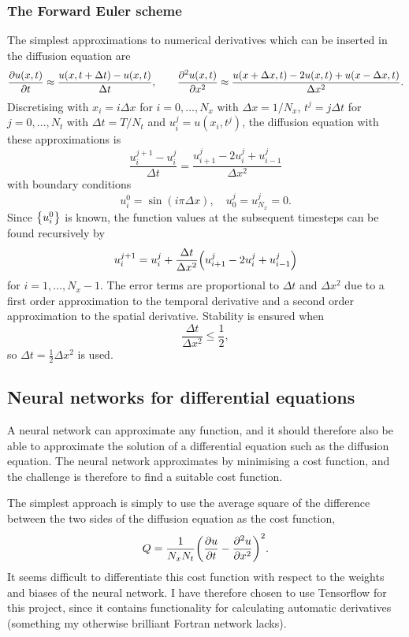 \documentclass[11pt,british,a4paper]{article}
\numberwithin{equation}{section}
\begin{document}
\subsubsection{The Forward Euler scheme}
The simplest approximations to numerical derivatives which can be inserted in the diffusion equation are
\begin{equation}
    \pdv{u(x,t)}{t} \approx \frac{u(x,t+\Delta t) - u(x,t)}{\Delta t}, \qquad
    \pdv[2]{u(x,t)}{x} \approx \frac{u(x+\Delta x, t) - 2u(x,t) + u(x-\Delta x,t)}{\Delta x^2}.
\end{equation}
Discretising with \(x_i=i\Delta x\) for \(i=0,\ldots,N_x\) with \(\Delta x=1/N_x\), \(t^j=j\Delta t\) for \(j=0,\ldots,N_t\) with \(\Delta t=T/N_t\) and \(u_i^j = u(x_i,t^j)\), the diffusion equation with these approximations is
\begin{equation}
    \frac{u_i^{j+1} - u_i^j}{\Delta t} = \frac{u_{i+1}^j - 2u_i^j + u_{i-1}^j}{\Delta x^2}
\end{equation}
with boundary conditions
\begin{equation}
    u_i^0 = \sin(i\pi\Delta x),\quad
    u_0^j = u_{N_x}^j = 0.
\end{equation}
Since \(\qty{u_i^0}\) is known, the function values at the subsequent timesteps can be found recursively by
\begin{equation}
    u_i^{j+1} = u_i^j + \frac{\Delta t}{\Delta x^2} \qty(u_{i+1}^j - 2u_i^j + u_{i-1}^j)
\end{equation}
for \(i=1,\ldots,N_x-1\). The error terms are proportional to \(\Delta t\) and \(\Delta x^2\) due to a first order approximation to the temporal derivative and a second order approximation to the spatial derivative. Stability is ensured\cite{tveito} when
\begin{equation}
    \frac{\Delta t}{\Delta x^2} \leq \frac{1}{2},
\end{equation}
so \(\Delta t = \tfrac{1}{2}\Delta x^2\) is used.

\subsection{Neural networks for differential equations}
A neural network can approximate any function, and it should therefore also be able to approximate the solution of a differential equation such as the diffusion equation. The neural network approximates by minimising a cost function, and the challenge is therefore to find a suitable cost function.

The simplest approach is simply to use the average square of the difference between the two sides of the diffusion equation as the cost function,
\begin{equation}
    Q = \frac{1}{N_xN_t}\qty(\pdv{u}{t} - \pdv[2]{u}{x})^2.
\end{equation}
It seems difficult to differentiate this cost function with respect to the weights and biases of the neural network. I have therefore chosen to use Tensorflow\cite{tensorflow} for this project, since it contains functionality for calculating automatic derivatives (something my otherwise brilliant Fortran network lacks).
\end{document}
